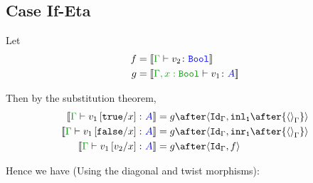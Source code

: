 \documentclass{report}
\begin{document}
\subsection{Case If-Eta}
    Let 
    \begin{align*}
        f & = \deno{\typerelation{\G}{v_2}{\B}} \\
        g & = \deno{\typerelation{\G, x: \B}{v_1}{ A}} \\
    \end{align*}


    Then by the substitution theorem,
    \begin{align*}
        \deno{\typerelation{\G}{v_1\ssub{x}{\t}}{ A}} & = g\after\pr{\idg}{\inl_\1\after{\term{\G}}}\\
        \deno{\typerelation{\G}{v_1\ssub{x}{\f}}{ A}} & = g\after\pr{\idg}{\inr_\1\after{\term{\G}}}\\
        \deno{\gtyperelation{v_1\ssub{x}{v_2}}{ A}} & = g\after\pr{\idg}{f}
    \end{align*}

    Hence we have (Using the diagonal and twist morphisms):
 
\end{document}
